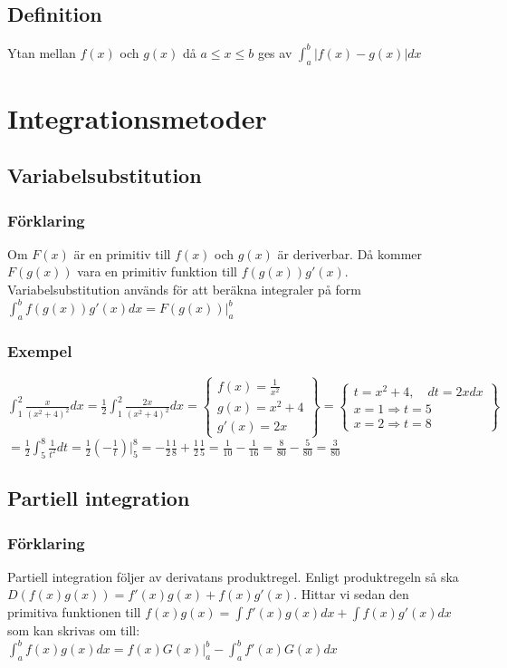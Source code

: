 \documentclass{article}
\begin{document}
\subsection{Definition}
Ytan mellan $f(x)$ och $g(x)$ då $a\leq x\leq b$ ges av ${\displaystyle \int_{a}^{b} |f(x)-g(x)|dx}$

\section{Integrationsmetoder}
\subsection{Variabelsubstitution}
\subsubsection{Förklaring}
Om $F(x)$ är en primitiv till $f(x)$ och $g(x)$ är deriverbar. Då kommer $F(g(x))$ vara en primitiv funktion till $f(g(x))g'(x)$. Variabelsubstitution används för att beräkna integraler på form ${\displaystyle\int_{a}^{b}f(g(x))g'(x)dx=F(g(x))\bigg\vert_{a}^{b}}$

\subsubsection{Exempel}
${\displaystyle \int_{1}^{2}\frac{x}{(x^2+4)^2}dx = \frac{1}{2}\int_{1}^{2}\frac{2x}{(x^2+4)^2}dx = \left\{
\begin{array}{l}
    f(x) = \frac{1}{x^2}   \\
    g(x) = x^2+4           \\
    g'(x)= 2x
\end{array}
\right\} = \left\{
\begin{array}{l}
    t=x^2+4,\quad dt=2xdx \\
    x=1 \Rightarrow t=5 \\
    x=2 \Rightarrow t=8
\end{array}
\right\}}$ \\
${\displaystyle= \frac{1}{2}\int_{5}^{8}\frac{1}{t^2}dt = \frac{1}{2}(-\frac{1}{t})\bigg\vert_{5}^{8}=-\frac{1}{2}\frac{1}{8}+\frac{1}{2}\frac{1}{5}=\frac{1}{10}-\frac{1}{16}=\frac{8}{80}-\frac{5}{80}=\frac{3}{80}}$

\subsection{Partiell integration}
\subsubsection{Förklaring}
Partiell integration följer av derivatans produktregel. Enligt produktregeln så ska $D(f(x)g(x))=f'(x)g(x)+f(x)g'(x)$. Hittar vi sedan den primitiva funktionen till ${\displaystyle f(x)g(x)=\int f'(x)g(x)dx + \int f(x)g'(x)dx}$ som kan skrivas om till:\\
${\displaystyle\int_{a}^{b}f(x)g(x)dx=f(x)G(x)\bigg\vert_{a}^{b} - \int_{a}^{b}f'(x)G(x)dx}$
\end{document}
